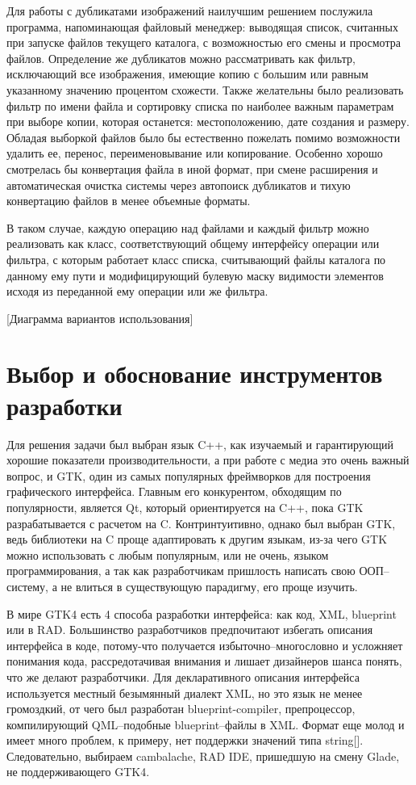 \documentclass[variant=courcework]{bsuir}
\begin{document}
Для работы с дубликатами изображений наилучшим решением послужила программа,
напоминающая файловый менеджер: выводящая список, считанных при запуске файлов
текущего каталога, с возможностью его смены и просмотра файлов. Определение же
дубликатов можно рассматривать как фильтр, исключающий все изображения, имеющие
копию с большим или равным указанному значению процентом схожести. Также
желательны было реализовать фильтр по имени файла и сортировку списка по
наиболее важным параметрам при выборе копии, которая останется: местоположению,
дате создания и размеру. Обладая выборкой файлов было бы естественно пожелать
помимо возможности удалить ее, перенос, переименовывание или копирование.
Особенно хорошо смотрелась бы конвертация файла в иной формат, при смене
расширения и автоматическая очистка системы через автопоиск дубликатов и тихую
конвертацию файлов в менее объемные форматы.

В таком случае, каждую операцию над файлами и каждый фильтр можно реализовать
как класс, соответствующий общему интерфейсу операции или фильтра, с которым
работает класс списка, считывающий файлы каталога по данному ему пути и
модифицирующий булевую маску видимости элементов исходя из переданной ему
операции или же фильтра.

[Диаграмма вариантов использования]

\section{Выбор и обоснование инструментов разработки}

Для решения задачи был выбран язык C++, как изучаемый и гарантирующий хорошие
показатели производительности, а при работе с медиа это очень важный вопрос, и
GTK, один из самых популярных фреймворков для построения графического
интерфейса. Главным его конкурентом, обходящим по популярности, является Qt,
который ориентируется на C++, пока GTK разрабатывается с расчетом на C.
Контринтуитивно, однако был выбран GTK, ведь библиотеки на C проще адаптировать
к другим языкам, из-за чего GTK можно использовать с любым популярным, или не
очень, языком программирования, а так как разработчикам пришлость написать свою
ООП--систему, а не влиться в существующую парадигму, его проще изучить.

В мире GTK4 есть 4 способа разработки интерфейса: как код, XML, blueprint или в
RAD. Большинство разработчиков предпочитают избегать описания интерфейса в коде,
потому-что получается избыточно--многословно и усложняет понимания кода,
рассредотачивая внимания и лишает дизайнеров шанса понять, что же делают
разработчики. Для декларативного описания интерфейса используется местный
безымянный диалект XML, но это язык не менее громоздкий, от чего был разработан
blueprint-compiler, препроцессор, компилирующий QML--подобные blueprint--файлы в
XML. Формат еще молод и имеет много проблем, к примеру, нет поддержки значений
типа string[]. Следовательно, выбираем cambalache, RAD IDE, пришедшую на смену
Glade, не поддерживающего GTK4.
\end{document}
